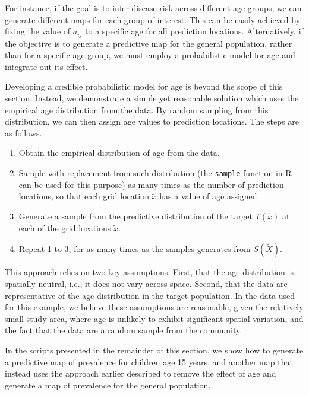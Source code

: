 \documentclass[
  letterpaper,
]{krantz}
\providecommand{\tightlist}{%
  \setlength{\itemsep}{0pt}\setlength{\parskip}{0pt}}
\begin{document}
For instance, if the goal is to infer disease risk across different age
groups, we can generate different maps for each group of interest. This
can be easily achieved by fixing the value of \(a_{ij}\) to a specific
age for all prediction locations. Alternatively, if the objective is to
generate a predictive map for the general population, rather than for a
specific age group, we must employ a probabilistic model for age and
integrate out its effect.

Developing a credible probabilistic model for age is beyond the scope of
this section. Instead, we demonstrate a simple yet reasonable solution
which uses the empirical age distribution from the data. By random
sampling from this distribution, we can then assign age values to
prediction locations. The steps are as follows.

\begin{enumerate}
\def\labelenumi{\arabic{enumi}.}
\tightlist
\item
  Obtain the empirical distribution of age from the data.
\item
  Sample with replacement from such distribution (the \texttt{sample}
  function in R can be used for this purpose) as many times as the
  number of prediction locations, so that each grid location
  \(\tilde{x}\) has a value of age assigned.
\item
  Generate a sample from the predictive distribution of the target
  \(T(\tilde{x})\) at each of the grid locations \(\tilde{x}\).
\item
  Repeat 1 to 3, for as many times as the samples generates from
  \(S(\tilde{X})\).
\end{enumerate}

This approach relies on two key assumptions. First, that the age
distribution is spatially neutral, i.e., it does not vary across space.
Second, that the data are representative of the age distribution in the
target population. In the data used for this example, we believe these
assumptions are reasonable, given the relatively small study area, where
age is unlikely to exhibit significant spatial variation, and the fact
that the data are a random sample from the community.

In the scripts presented in the remainder of this section, we show how
to generate a predictive map of prevalence for children age 15 years,
and another map that instead uses the approach earlier described to
remove the effect of age and generate a map of prevalence for the
general population.
\end{document}
